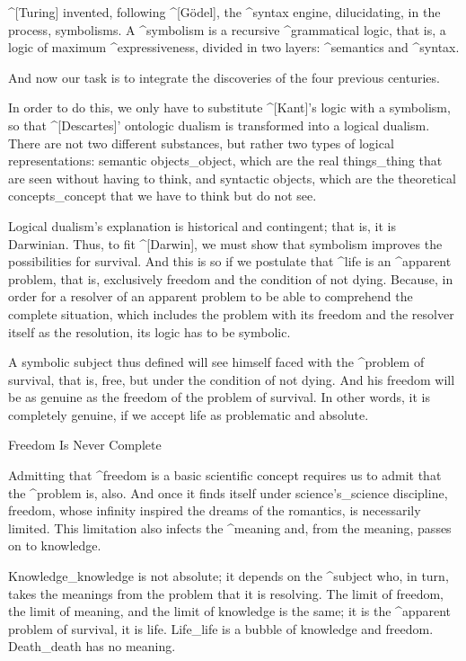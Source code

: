  ^[Turing] invented, following ^[Gödel], the ^{syntax
engine}, dilucidating, in the process, symbolisms. A ^{symbolism} is a
recursive ^{grammatical logic}, that is, a logic of maximum
^{expressiveness}, divided in two layers: ^{semantics} and ^{syntax}.

 And now our task is to integrate the discoveries of the
four previous centuries.

\noindent
In order to do this, we only have to substitute ^[Kant]'s logic with a
symbolism, so that ^[Descartes]' ontologic dualism is transformed into a
logical dualism. There are not two different substances, but rather two
types of logical representations: semantic objects_{object}, which are
the real things_{thing} that are seen without having to think, and
syntactic objects, which are the theoretical concepts_{concept} that we
have to think but do not see.

Logical dualism's explanation is historical and contingent; that is, it
is Darwinian. Thus, to fit ^[Darwin], we must show that symbolism
improves the possibilities for survival. And this is so if we postulate
that ^{life} is an ^{apparent problem}, that is, exclusively freedom and
the condition of not dying. Because, in order for a resolver of an
apparent problem to be able to comprehend the complete situation, which
includes the problem with its freedom and the resolver itself as the
resolution, its logic has to be symbolic.

A symbolic subject thus defined will see himself faced with the
^{problem of survival}, that is, free, but under the condition of not
dying. And his freedom will be as genuine as the freedom of the problem
of survival. In other words, it is completely genuine, if we accept life
as problematic and absolute.


\Section Freedom Is Never Complete

Admitting that ^{freedom} is a basic scientific concept requires us to
admit that the ^{problem} is, also. And once it finds itself under
science's_{science} discipline, freedom, whose infinity inspired the
dreams of the romantics, is necessarily limited. This limitation also
infects the ^{meaning} and, from the meaning, passes on to knowledge.

Knowledge_{knowledge} is not absolute; it depends on the ^{subject} who,
in turn, takes the meanings from the problem that it is resolving. The
limit of freedom, the limit of meaning, and the limit of knowledge is
the same; it is the ^{apparent problem} of survival, it is life.
Life_{life} is a bubble of knowledge and freedom. Death_{death} has no
meaning.

